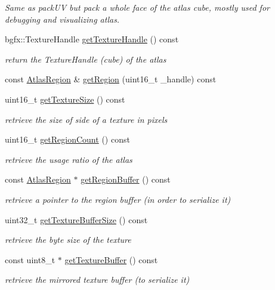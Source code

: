 \begin{DoxyCompactItemize}
\begin{DoxyCompactList}\small\item\em Same as pack\+U\+V but pack a whole face of the atlas cube, mostly used for debugging and visualizing atlas. \end{DoxyCompactList}\item 
bgfx\+::\+Texture\+Handle \hyperlink{class_atlas_a29e5555b54bbc408fe3acaae5b6865fb}{get\+Texture\+Handle} () const 
\begin{DoxyCompactList}\small\item\em return the Texture\+Handle (cube) of the atlas \end{DoxyCompactList}\item 
const \hyperlink{struct_atlas_region}{Atlas\+Region} \& \hyperlink{class_atlas_a154969b95f417af83ff4a491844277f5}{get\+Region} (uint16\+\_\+t \+\_\+handle) const 
\item 
uint16\+\_\+t \hyperlink{class_atlas_ab73dcbe95fb235270079c7cf361ed6e4}{get\+Texture\+Size} () const 
\begin{DoxyCompactList}\small\item\em retrieve the size of side of a texture in pixels \end{DoxyCompactList}\item 
uint16\+\_\+t \hyperlink{class_atlas_ad6e9f297bdd228f523680f424b80c4b9}{get\+Region\+Count} () const 
\begin{DoxyCompactList}\small\item\em retrieve the usage ratio of the atlas \end{DoxyCompactList}\item 
const \hyperlink{struct_atlas_region}{Atlas\+Region} $\ast$ \hyperlink{class_atlas_a53af5c63852e7ea43dac65143e8dea10}{get\+Region\+Buffer} () const 
\begin{DoxyCompactList}\small\item\em retrieve a pointer to the region buffer (in order to serialize it) \end{DoxyCompactList}\item 
uint32\+\_\+t \hyperlink{class_atlas_aec85664ca2db35e1c3b95bb9b79555f9}{get\+Texture\+Buffer\+Size} () const 
\begin{DoxyCompactList}\small\item\em retrieve the byte size of the texture \end{DoxyCompactList}\item 
const uint8\+\_\+t $\ast$ \hyperlink{class_atlas_aa04789505132e47c89e9735c0d8d865c}{get\+Texture\+Buffer} () const 
\begin{DoxyCompactList}\small\item\em retrieve the mirrored texture buffer (to serialize it) \end{DoxyCompactList}\end{DoxyCompactItemize}


